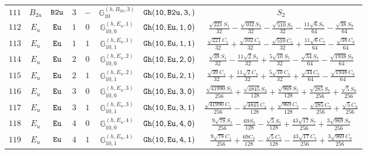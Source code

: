 \documentclass[fleqn,8pt]{jsarticle}
\begin{document}
\begin{table}[ht!]
\begin{center}
\begin{tabular}{cccccccc}
$ 111 $ & $ B_{2u} $ & $ {\tt B2u} $ & $ 3 $ & $ - $ & $ \mathbb{G}_{10}^{(h,B_{2u},3)} $ & $ {\tt Gh(10,B2u,3,)} $ & $ S_{2} $ \\
$ 112 $ & $ E_{u} $ & $ {\tt Eu} $ & $ 1 $ & $ 0 $ & $ \mathbb{G}_{10,0}^{(h,E_{u},1)} $ & $ {\tt Gh(10,Eu,1,0)} $ & $ \frac{\sqrt{221} S_{1}}{32} - \frac{\sqrt{102} S_{3}}{32} - \frac{\sqrt{510} S_{5}}{32} - \frac{11 \sqrt{6} S_{7}}{64} - \frac{\sqrt{38} S_{9}}{64} $ \\
$ 113 $ & $ E_{u} $ & $ {\tt Eu} $ & $ 1 $ & $ 1 $ & $ \mathbb{G}_{10,1}^{(h,E_{u},1)} $ & $ {\tt Gh(10,Eu,1,1)} $ & $ \frac{\sqrt{221} C_{1}}{32} + \frac{\sqrt{102} C_{3}}{32} - \frac{\sqrt{510} C_{5}}{32} + \frac{11 \sqrt{6} C_{7}}{64} - \frac{\sqrt{38} C_{9}}{64} $ \\
$ 114 $ & $ E_{u} $ & $ {\tt Eu} $ & $ 2 $ & $ 0 $ & $ \mathbb{G}_{10,0}^{(h,E_{u},2)} $ & $ {\tt Gh(10,Eu,2,0)} $ & $ \frac{\sqrt{39} S_{1}}{32} - \frac{11 \sqrt{2} S_{3}}{32} + \frac{5 \sqrt{10} S_{5}}{32} - \frac{\sqrt{34} S_{7}}{64} - \frac{\sqrt{1938} S_{9}}{64} $ \\
$ 115 $ & $ E_{u} $ & $ {\tt Eu} $ & $ 2 $ & $ 1 $ & $ \mathbb{G}_{10,1}^{(h,E_{u},2)} $ & $ {\tt Gh(10,Eu,2,1)} $ & $ \frac{\sqrt{39} C_{1}}{32} + \frac{11 \sqrt{2} C_{3}}{32} + \frac{5 \sqrt{10} C_{5}}{32} + \frac{\sqrt{34} C_{7}}{64} - \frac{\sqrt{1938} C_{9}}{64} $ \\
$ 116 $ & $ E_{u} $ & $ {\tt Eu} $ & $ 3 $ & $ 0 $ & $ \mathbb{G}_{10,0}^{(h,E_{u},3)} $ & $ {\tt Gh(10,Eu,3,0)} $ & $ \frac{\sqrt{41990} S_{1}}{256} + \frac{\sqrt{4845} S_{3}}{128} + \frac{\sqrt{969} S_{5}}{128} + \frac{\sqrt{285} S_{7}}{256} + \frac{\sqrt{5} S_{9}}{256} $ \\
$ 117 $ & $ E_{u} $ & $ {\tt Eu} $ & $ 3 $ & $ 1 $ & $ \mathbb{G}_{10,1}^{(h,E_{u},3)} $ & $ {\tt Gh(10,Eu,3,1)} $ & $ \frac{\sqrt{41990} C_{1}}{256} - \frac{\sqrt{4845} C_{3}}{128} + \frac{\sqrt{969} C_{5}}{128} - \frac{\sqrt{285} C_{7}}{256} + \frac{\sqrt{5} C_{9}}{256} $ \\
$ 118 $ & $ E_{u} $ & $ {\tt Eu} $ & $ 4 $ & $ 0 $ & $ \mathbb{G}_{10,0}^{(h,E_{u},4)} $ & $ {\tt Gh(10,Eu,4,0)} $ & $ \frac{9 \sqrt{78} S_{1}}{256} - \frac{69 S_{3}}{128} - \frac{\sqrt{5} S_{5}}{128} + \frac{43 \sqrt{17} S_{7}}{256} + \frac{3 \sqrt{969} S_{9}}{256} $ \\
$ 119 $ & $ E_{u} $ & $ {\tt Eu} $ & $ 4 $ & $ 1 $ & $ \mathbb{G}_{10,1}^{(h,E_{u},4)} $ & $ {\tt Gh(10,Eu,4,1)} $ & $ \frac{9 \sqrt{78} C_{1}}{256} + \frac{69 C_{3}}{128} - \frac{\sqrt{5} C_{5}}{128} - \frac{43 \sqrt{17} C_{7}}{256} + \frac{3 \sqrt{969} C_{9}}{256} $ \\

\end{tabular}
\end{center}
\end{table}
\end{document}
